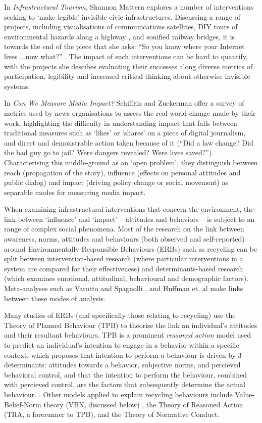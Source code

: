 \documentclass[nofonts,nols,justified,nobib]{tufte-book}
\begin{document}
In \emph{Infrastructural Tourism}, Shannon Mattern explores a number of interventions seeking to `make legible' invisible civic infrastructures. Discussing a range of projects, including visualisations of communications satellites, DIY tours of environmental hazards along a highway \cite{balkin_invisible5_2006}, and sonified railway bridges, it is towards the end of the piece that she asks: ``So you know where your Internet lives ...now what?'' \cite{mattern_infrastructural_2013}. The impact of such interventions can be hard to quantify, with the projects she descibes evaluating their successes along diverse metrics of participation, legibility and increased critical thinking about otherwise invisible systems. 

In \emph{Can We Measure Media Impact?} Schiffrin and Zuckerman offer a survey of metrics used by news organisations to assess the real-world change made by their work, highlighting the difficulty in understanding impact that falls between traditional measures such as `likes' or `shares' on a piece of digital journalism, and direct and demonstrable action taken because of it (``Did a law change? Did the bad guy go to jail? Were dangers revealed? Were lives saved?''). Characterising this middle-ground as an `open problem', they distinguish between reach (propagation of the story), influence (effects on personal attitudes and public dialog) and impact (driving policy change or social movement) as separable modes for measuring media impact. \cite{anya_schiffrin_can_2015}

When examining infrastructural interventions that concern the environment, the link between `influence' and `impact' -- attitudes and behaviors -- is subject to an range of complex social phenomena. Most of the research on the link between awareness, norms, attitudes and behaviours (both observed and self-reported) around Environmentally Responsible Behaviours (ERBs) such as recycling can be split between intervention-based research (where particular interventions in a system are compared for their effectiveness) and determinants-based research (which examines emotional, attitudinal, behavioural and demographic factors). Meta-analyses such as Varotto and Spagnolli \cite{varotto_psychological_2017}, and Huffman et. al \cite{huffman_when_2014} make links between these modes of analysis.

Many studies of ERBs (and specifically those relating to recycling) use the Theory of Planned Behaviour (TPB) to theorise the link an individual's attitudes and their resultant behaviours. TPB is a prominent \emph{reasoned action} model used to predict an individual's intention to engage in a behavior within a specific context, which proposes that intention to perform a behaviour is driven by 3 determinants: attitudes towards a behavior, subjective norms, and percieved behavioral control, and that the intention to perform the behaviour, combined with percieved control, are the factors that subsequently determine the actual behaviour. \cite{ajzen_theory_1991}. Other models applied to explain recycling behaviours include Value-Belief-Norm theory (VBN, discussed below) \cite{huffman_when_2014}, the Theory of Reasoned Action (TRA, a forerunner to TPB), and the Theory of Normative Conduct.
\end{document}

